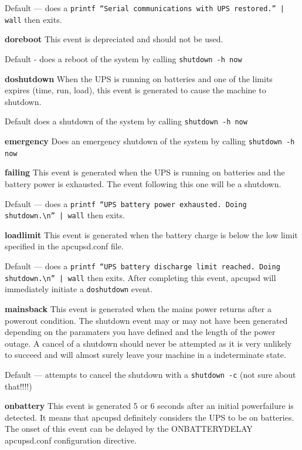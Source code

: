 {{{{{{{{{\begin{description}
Default {---} does a {\tt printf ``Serial communications with UPS restored.''
| wall} then exits.  

\item {\bf doreboot}
This event is depreciated and should not be used.  

Default - does a reboot of the system by calling {\tt shutdown -h now}  

\item {\bf doshutdown}
When the UPS is running on batteries and one of the limits expires (time, run,
load), this event is generated to cause the machine to shutdown.  

Default does a shutdown of the system by calling {\tt shutdown -h now}  

\item {\bf emergency}
Does an emergency shutdown of the system by calling {\tt shutdown -h now}  

\item {\bf failing}
This event is generated when the UPS is running on batteries and the battery
power is exhausted. The event following this one will be a shutdown.  

Default {---} does a {\tt printf ``UPS battery power exhausted. Doing
shutdown.\textbackslash{}n'' | wall} then exits.  

\item {\bf loadlimit}
This event is generated when the battery charge is below the low limit
specified in the apcupsd.conf file.  

Default {---} does a {\tt printf ``UPS battery discharge limit reached. Doing
shutdown.\textbackslash{}n'' | wall} then exits.  After completing this event,
apcupsd will immediately initiate a {\tt doshutdown} event.  

\item {\bf mainsback}
This event is generated when the mains power returns after a powerout
condition. The shutdown event may or may not have been generated depending on
the paramaters you have defined and the length of the power outage. A cancel
of a shutdown should never be attempted as it is very unlikely to succeed and
will almost surely leave your machine in a indeterminate state.  

Default {---} attempts to cancel the shutdown with a {\tt shutdown -c} (not
sure about that!!!!)  

\item {\bf onbattery}
This event is generated 5 or 6 seconds after an initial powerfailure is
detected. It means that apcupsd definitely considers the UPS to be on
batteries. The onset of this event can be delayed by the ONBATTERYDELAY
apcupsd.conf configuration directive.  


\end{description}}}}}}}}}}
